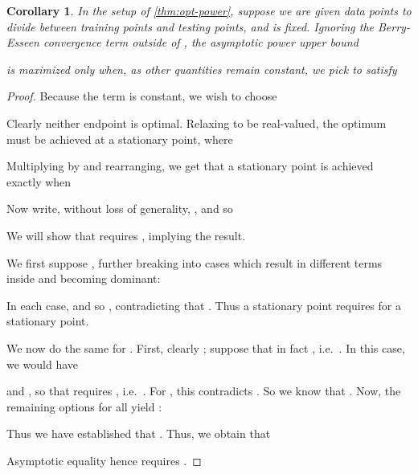 \documentclass{article}
\newtheorem{corollary}[theorem]{Corollary} \crefname{corollary}{Corollary}{Corollaries}
\begin{document}
\begin{corollary} \label{thm:opt-power-rate}
    In the setup of \cref{thm:opt-power},
    suppose we are given  data points to divide between
     training points
    and  testing points,
    and  is fixed.
    Ignoring the Berry-Esseen convergence term outside of ,
    the asymptotic power upper bound
    
    is maximized only when,
    as other quantities remain constant,
    we pick  to satisfy
    
\end{corollary}
\begin{proof}
    Because the  term is constant,
    we wish to choose
    
    Clearly neither endpoint is optimal.
    Relaxing  to be real-valued,
    the optimum must be achieved at a stationary point, where
    
    Multiplying by  and rearranging,
    we get that a stationary point is achieved exactly when
    

    Now write, without loss of generality, ,
    and so
    
    We will show that  requires ,
    implying the result.

    We first suppose ,
    further breaking into cases which result in different terms inside  and  becoming dominant:
    
    In each case,  and so ,
    contradicting that .
    Thus a stationary point requires  for a stationary point.

    We now do the same for .
    First, clearly ; suppose that in fact ,
    i.e.\ .
    In this case, we would have
    
    and ,
    so that  requires ,
    i.e.\ .
    For ,
    this contradicts .
    So we know that .
    Now, the remaining options for  all yield :
    

    Thus we have established that .
    Thus, we obtain that
    
    Asymptotic equality hence requires
    .
\end{proof}
\end{document}
